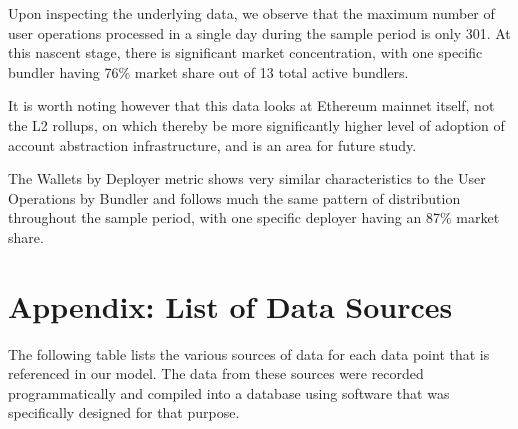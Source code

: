 \documentclass[conference]{IEEEtran}
\begin{document}
Upon inspecting the underlying data, we observe that the maximum number of user operations processed in a single day during the sample period is only 301.  At this nascent stage, there is significant market concentration, with one specific bundler having 76\% market share out of 13 total active bundlers.

It is worth noting however that this data looks at Ethereum mainnet itself, not the L2 rollups, on which thereby be more significantly higher level of adoption of account abstraction infrastructure, and is an area for future study.

The Wallets by Deployer metric shows very similar characteristics to the User Operations by Bundler and follows much the same pattern of distribution throughout the sample period, with one specific deployer having an 87\% market share.


\newpage

\printbibliography

\newpage

\onecolumn

\section{Appendix: List of Data Sources}

\vspace{12pt}

The following table lists the various sources of data for each data point that is referenced in our model.  The data from these sources were recorded programmatically and compiled into a database using software that was specifically designed for that purpose.

\vspace{24pt}
\end{document}

